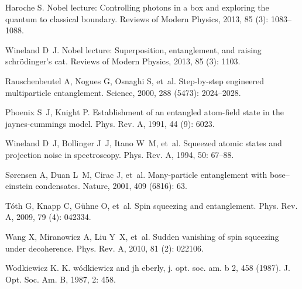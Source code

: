 \begin{thebibliography}{113}
	Haroche S.
	\newblock Nobel lecture: Controlling photons in a box and exploring the quantum
	to classical boundary\allowbreak[J].
	\newblock Reviews of Modern Physics, 2013, 85 (3): 1083--1088.
	
	Wineland D~J.
	\newblock Nobel lecture: Superposition, entanglement, and raising
	schr{\"o}dinger’s cat\allowbreak[J].
	\newblock Reviews of Modern Physics, 2013, 85 (3): 1103.
	
	Rauschenbeutel A, Nogues G, Osnaghi S, et~al.
	\newblock Step-by-step engineered multiparticle entanglement\allowbreak[J].
	\newblock Science, 2000, 288 (5473): 2024--2028.
	
	Phoenix S~J, Knight P.
	\newblock Establishment of an entangled atom-field state in the jaynes-cummings
	model\allowbreak[J].
	\newblock Phys. Rev. A, 1991, 44 (9): 6023.
	
	Wineland D~J, Bollinger J~J, Itano W~M, et~al.
	\newblock Squeezed atomic states and projection noise in
	spectroscopy\allowbreak[J].
	\newblock Phys. Rev. A, 1994, 50: 67--88.
	
	S{\o}rensen A, Duan L~M, Cirac J, et~al.
	\newblock Many-particle entanglement with bose--einstein
	condensates\allowbreak[J].
	\newblock Nature, 2001, 409 (6816): 63.
	
	T{\'o}th G, Knapp C, G{\"u}hne O, et~al.
	\newblock Spin squeezing and entanglement\allowbreak[J].
	\newblock Phys. Rev. A, 2009, 79 (4): 042334.
	
	Wang X, Miranowicz A, Liu Y~X, et~al.
	\newblock Sudden vanishing of spin squeezing under decoherence\allowbreak[J].
	\newblock Phys. Rev. A, 2010, 81 (2): 022106.
	
	Wodkiewicz K.
	\newblock K. w{\'o}dkiewicz and jh eberly, j. opt. soc. am. b 2, 458
	(1987)\allowbreak[J].
	\newblock J. Opt. Soc. Am. B, 1987, 2: 458.
	

\end{thebibliography}
